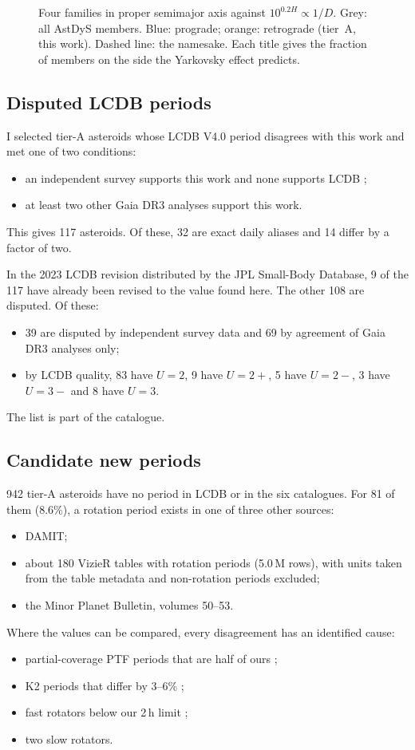 \documentclass[twocolumn]{aastex631}
\begin{document}
\begin{figure}
\caption{Four families in proper semimajor axis against $10^{0.2H}\propto1/D$. Grey: all AstDyS members.
Blue: prograde; orange: retrograde (tier~A, this work). Dashed line: the namesake. Each title gives the
fraction of members on the side the Yarkovsky effect predicts.\label{fig:yark}}
\end{figure}

\subsection{Disputed LCDB periods}

I selected tier-A asteroids whose LCDB V4.0 period disagrees with this work and met one of two conditions:
\begin{itemize}
\item an independent survey supports this work and none supports LCDB
\citep{Vavilov2025,McNeill2023,Erasmus2020};
\item at least two other Gaia DR3 analyses support this work.
\end{itemize}
This gives 117 asteroids. Of these, 32 are exact daily aliases and 14 differ by a factor of two.

In the 2023 LCDB revision distributed by the JPL Small-Body Database, 9 of the 117 have already been
revised to the value found here. The other 108 are disputed. Of these:
\begin{itemize}
\item 39 are disputed by independent survey data and 69 by agreement of Gaia DR3 analyses only;
\item by LCDB quality, 83 have $U=2$, 9 have $U=2+$, 5 have $U=2-$, 3 have $U=3-$ and 8 have $U=3$.
\end{itemize}
The list is part of the catalogue.

\subsection{Candidate new periods}

942 tier-A asteroids have no period in LCDB or in the six catalogues. For 81 of them (8.6\%), a rotation
period exists in one of three other sources:
\begin{itemize}
\item DAMIT;
\item about 180 VizieR tables with rotation periods (5.0\,M rows), with units taken from the table metadata
and non-rotation periods excluded;
\item the Minor Planet Bulletin, volumes 50--53.
\end{itemize}
Where the values can be compared, every disagreement has an identified cause:
\begin{itemize}
\item partial-coverage PTF periods that are half of ours \citep{Chang2016};
\item K2 periods that differ by 3--6\% \citep{Sergeyev2025};
\item fast rotators below our 2\,h limit \citep{Erasmus2019};
\item two slow rotators.
\end{itemize}
\end{document}
